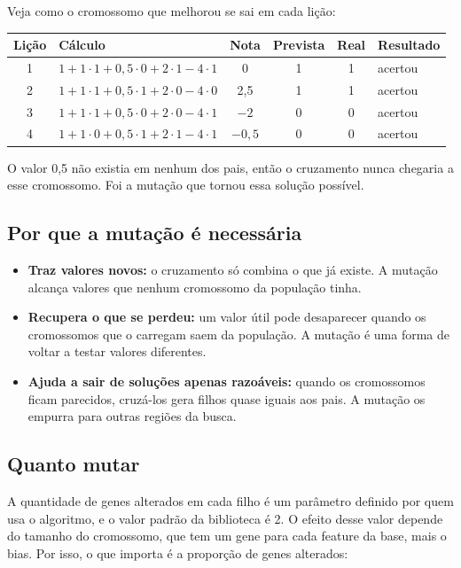\documentclass[11pt,a4paper]{article}
\newenvironment{tabela}{\par\nopagebreak[4]\vspace{0.3em}\nopagebreak[4]\begingroup\centering\small}{\par\endgroup\vspace{0.6em}}
\begin{document}
Veja como o cromossomo que melhorou se sai em cada lição:

\begin{tabela}
\begin{tabular}{clcccl}
\toprule
Lição & Cálculo & Nota & Prevista & Real & Resultado\\
\midrule
1 & $1 + 1\cdot1 + 0{,}5\cdot0 + 2\cdot1 - 4\cdot1$ & 0 & 1 & 1 & acertou\\
2 & $1 + 1\cdot1 + 0{,}5\cdot1 + 2\cdot0 - 4\cdot0$ & 2,5 & 1 & 1 & acertou\\
3 & $1 + 1\cdot1 + 0{,}5\cdot0 + 2\cdot0 - 4\cdot1$ & $-2$ & 0 & 0 & acertou\\
4 & $1 + 1\cdot0 + 0{,}5\cdot1 + 2\cdot1 - 4\cdot1$ & $-0{,}5$ & 0 & 0 & acertou\\
\bottomrule
\end{tabular}
\end{tabela}

O valor 0,5 não existia em nenhum dos pais, então o cruzamento nunca chegaria a esse cromossomo. Foi a mutação que tornou essa solução possível.

\subsection{Por que a mutação é necessária}

\begin{itemize}
  \item \textbf{Traz valores novos:} o cruzamento só combina o que já existe. A mutação alcança valores que nenhum cromossomo da população tinha.
  \item \textbf{Recupera o que se perdeu:} um valor útil pode desaparecer quando os cromossomos que o carregam saem da população. A mutação é uma forma de voltar a testar valores diferentes.
  \item \textbf{Ajuda a sair de soluções apenas razoáveis:} quando os cromossomos ficam parecidos, cruzá-los gera filhos quase iguais aos pais. A mutação os empurra para outras regiões da busca.
\end{itemize}

\subsection{Quanto mutar}

A quantidade de genes alterados em cada filho é um parâmetro definido por quem usa o algoritmo, e o valor padrão da biblioteca é 2. O efeito desse valor depende do tamanho do cromossomo, que tem um gene para cada feature da base, mais o bias. Por isso, o que importa é a proporção de genes alterados:
\end{document}
